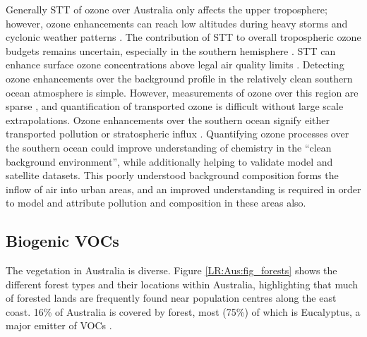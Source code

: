     
    Generally STT of ozone over Australia only affects the upper troposphere; however, ozone enhancements can reach low altitudes during heavy storms and cyclonic weather patterns \parencite{Alexander2013}.
    The contribution of STT to overall tropospheric ozone budgets remains uncertain, especially in the southern hemisphere \parencite{Skerlak2014}.
    STT can enhance surface ozone concentrations above legal air quality limits 
    \parencite[e.g.,][]{Lelieveld2009, Lin2015}.
    Detecting ozone enhancements over the background profile in the relatively clean southern ocean atmosphere is simple.
    However, measurements of ozone over this region are sparse \parencite{Skerlak2014}, and quantification of transported ozone is difficult without large scale extrapolations.
    Ozone enhancements over the southern ocean signify either transported pollution or stratospheric influx \parencite{Jacobson2000}.
    Quantifying ozone processes over the southern ocean could improve understanding of chemistry in the ``clean background environment'', while additionally helping to validate model and satellite datasets.
    This poorly understood background composition forms the inflow of air into urban areas, and an improved understanding is required in order to model and attribute pollution and composition in these areas also.
  
  
  \subsection{Biogenic VOCs}
    
    The vegetation in Australia is diverse.
    Figure \ref{LR:Aus:fig_forests} shows the different forest types and their locations within Australia, highlighting that much of forested lands are frequently found near population centres along the east coast.
    16\% of Australia is covered by forest, most (75\%) of which is Eucalyptus, a major emitter of VOCs \parencite{Guenther2012}.
    
    
